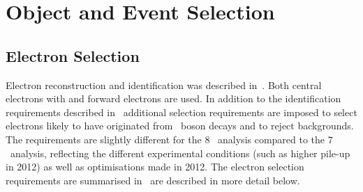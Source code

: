 \graphicspath{{Chapters/ObjEventSelection/Figures/}}
\chapter{Object and Event Selection}
\label{chap:ObjEventSelection}

\section{Electron Selection}
\label{sec:objsel-el}

Electron reconstruction and identification was described in~. Both
central electrons with  and forward electrons are used. In
addition to the identification requirements described in~
additional selection requirements are imposed to select electrons likely to have
originated from \Z\ boson decays and to reject backgrounds. The requirements are
slightly different for the 8 \tev\ analysis compared to the 7 \tev\ analysis,
reflecting the different experimental conditions (such as higher pile-up in
2012) as well as optimisations made in 2012. The electron selection requirements
are summarised in~ are described in more detail below. 

